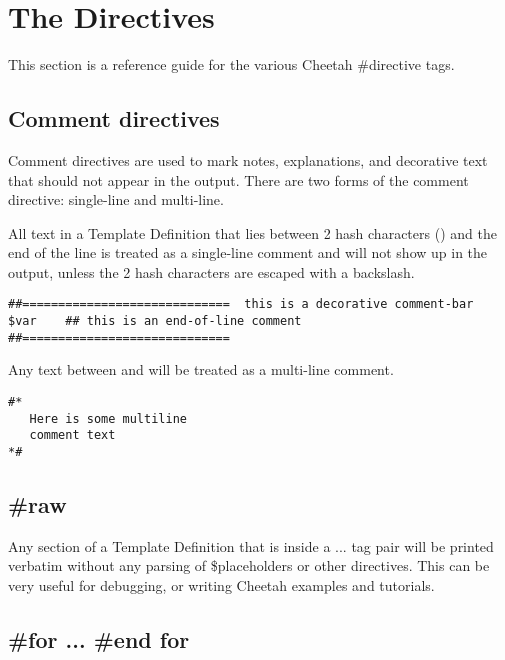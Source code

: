 \section{The Directives}
\label{directives}

This section is a reference guide for the various Cheetah \#directive tags.

\subsection{Comment directives}
\label{directives.comments}

Comment directives are used to mark notes, explanations, and decorative text
that should not appear in the output.  There are two forms of the comment
directive: single-line and multi-line.

All text in a Template Definition that lies between 2 hash characters
(\code{\#\#}) and the end of the line is treated as a single-line comment and
will not show up in the output, unless the 2 hash characters are escaped with a
backslash.
\begin{verbatim}
##=============================  this is a decorative comment-bar
$var    ## this is an end-of-line comment
##=============================
\end{verbatim}

Any text between \code{\#*} and \code{*\#} will be treated as a multi-line
comment.
\begin{verbatim}
#*
   Here is some multiline
   comment text
*#
\end{verbatim}

\subsection{\#raw}
\label{directives.raw}

Any section of a Template Definition that is inside a  ...
 tag pair will be printed verbatim without any parsing of
\$placeholders or other directives.  This can be very useful for debugging, or
writing Cheetah examples and tutorials.


\subsection{\#for ... \#end for}
\label{directives.for}

